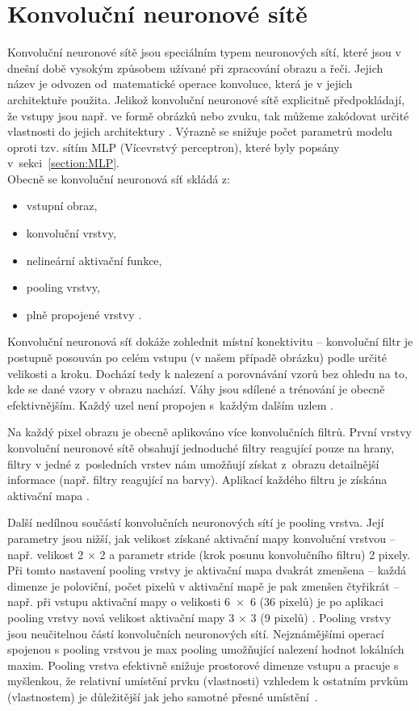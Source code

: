 \section{Konvoluční neuronové sítě}
Konvoluční neuronové sítě jsou speciálním typem neuronových sítí, které jsou v dnešní době vysokým způsobem užívané při zpracování obrazu a řeči. Jejich název je odvozen od~matematické operace konvoluce, která je v jejich architektuře použita. Jelikož konvoluční neuronové sítě explicitně předpokládají, že vstupy jsou např. ve formě obrázků nebo zvuku, tak můžeme zakódovat určité vlastnosti do jejich architektury \cite{CNNvsMLP}. Výrazně se snižuje počet parametrů modelu oproti tzv. sítím MLP (Vícevrstvý perceptron), které byly popsány v~sekci~\ref{section:MLP}.\\

Obecně se konvoluční neuronová síť skládá z:
\begin{itemize}
    \item vstupní obraz,
    \item konvoluční vrstvy,
    \item nelineární aktivační funkce,
    \item pooling vrstvy,
    \item plně propojené vrstvy \cite{PoolingLayers}.
\end{itemize}

Konvoluční neuronová síť dokáže zohlednit místní konektivitu -- konvoluční filtr je postupně posouván po celém vstupu (v našem případě obrázku) podle určité velikosti a kroku. Dochází tedy k nalezení a porovnávání vzorů bez ohledu na to, kde se dané vzory v obrazu nachází. Váhy jsou sdílené a trénování je obecně efektivnějším. Každý uzel není propojen s~každým dalším uzlem \cite{CNNvsMLP}.

Na každý pixel obrazu je obecně aplikováno více konvolučních filtrů. První vrstvy konvoluční neuronové sítě obsahují jednoduché filtry reagující pouze na hrany, filtry v jedné z~posledních vrstev nám umožňují získat z~obrazu detailnější informace (např. filtry reagující na barvy). Aplikací každého filtru je získána aktivační mapa \cite{CNNvsMLP}. 

Další nedílnou součástí konvolučních neuronových sítí je pooling vrstva. Její parametry jsou nižší, jak velikost získané aktivační mapy konvoluční vrstvou -- např. velikost 2 $\times$ 2 a parametr stride (krok posunu konvolučního filtru) 2 pixely. Při tomto nastavení pooling vrstvy je aktivační mapa dvakrát zmenšena -- každá dimenze je poloviční, počet pixelů v aktivační mapě je pak zmenšen čtyřikrát -- např. při vstupu aktivační mapy o velikosti 6~$\times$~6 (36 pixelů) je po aplikaci pooling vrstvy nová velikost aktivační mapy 3 $\times$ 3 (9 pixelů) \cite{PoolingLayers}. Pooling vrstvy jsou neučitelnou částí konvolučních neuronových sítí. Nejznámějšími operací spojenou s pooling vrstvou je max pooling umožňující nalezení hodnot lokálních maxim. Pooling vrstva efektivně snižuje prostorové dimenze vstupu a pracuje s myšlenkou, že relativní umístění prvku (vlastnosti) vzhledem k ostatním prvkům (vlastnostem) je důležitější jak jeho samotné přesné umístění~\cite{PoolingLayers}.


